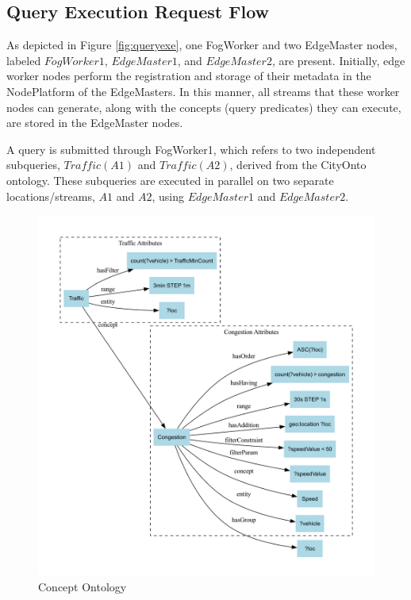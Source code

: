 \documentclass[5p,times]{elsarticle}
\begin{document}
\subsection{Query Execution Request Flow}


As depicted in Figure \ref{fig:queryexe}, one FogWorker and two EdgeMaster nodes, labeled $FogWorker1$,
 $EdgeMaster1$, and $EdgeMaster2$, are present. Initially,
  edge worker nodes perform the registration and storage of their metadata in the NodePlatform of the EdgeMasters.
   In this manner, all streams that these worker nodes can generate, along with the concepts (query predicates)
    they can execute, are stored in the EdgeMaster nodes.

A query is submitted through FogWorker1, which refers to two independent subqueries,
 $Traffic(A1)$ and $Traffic(A2)$, derived from the CityOnto ontology. 
These subqueries are executed in parallel on two separate locations/streams, $A1$ and $A2$,
 using $EdgeMaster1$ and $EdgeMaster2$. 


 \begin{figure}[t] %
  \centering
  \includegraphics[width=\columnwidth]{ConceptOnto_GraphViz_new.pdf}
  \caption{Concept Ontology}
  \label{fig:conceptonto}
\end{figure}
\end{document}
